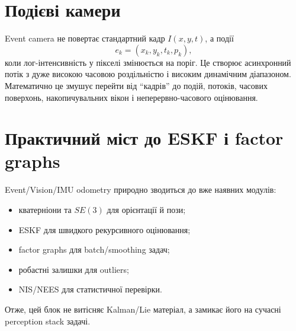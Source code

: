 \section{Подієві камери}

Event camera не повертає стандартний кадр $I(x,y,t)$, а події
\begin{equation}
  e_k=(x_k,y_k,t_k,p_k),
\end{equation}
коли лог-інтенсивність у пікселі змінюється на поріг. Це створює асинхронний потік з дуже високою часовою роздільністю і високим динамічним діапазоном. Математично це змушує перейти від ``кадрів'' до подій, потоків, часових поверхонь, накопичувальних вікон і неперервно-часового оцінювання.

\section{Практичний міст до ESKF і factor graphs}

Event/Vision/IMU odometry природно зводиться до вже наявних модулів:
\begin{itemize}[leftmargin=*]
\item кватерніони та $SE(3)$ для орієнтації й пози;
\item ESKF для швидкого рекурсивного оцінювання;
\item factor graphs для batch/smoothing задач;
\item робастні залишки для outliers;
\item NIS/NEES для статистичної перевірки.
\end{itemize}

Отже, цей блок не витісняє Kalman/Lie матеріал, а замикає його на сучасні perception stack задачі.
